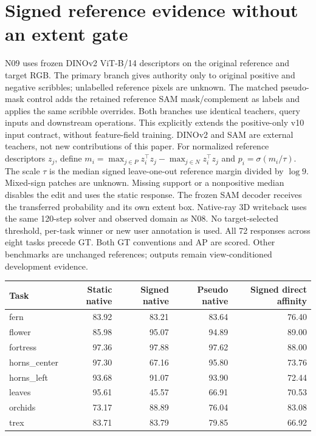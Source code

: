 \section{Signed reference evidence without an extent gate}
N09 uses frozen DINOv2 ViT-B/14 descriptors on the original reference and target RGB. The primary branch gives authority only to original positive and negative scribbles; unlabelled reference pixels are unknown. The matched pseudo-mask control adds the retained reference SAM mask/complement as labels and applies the same scribble overrides. Both branches use identical teachers, query inputs and downstream operations. This explicitly extends the positive-only v10 input contract, without feature-field training. DINOv2 and SAM are external teachers, not new contributions of this paper.
For normalized reference descriptors $z_j$, define $m_i=\max_{j\in P}z_i^\top z_j-\max_{j\in N}z_i^\top z_j$ and $p_i=\sigma(m_i/\tau)$. The scale $\tau$ is the median signed leave-one-out reference margin divided by $\log 9$. Mixed-sign patches are unknown. Missing support or a nonpositive median disables the edit and uses the static response. The frozen SAM decoder receives the transferred probability and its own extent box. Native-ray 3D writeback uses the same 120-step solver and observed domain as N08. No target-selected threshold, per-task winner or new user annotation is used.
All 72 responses across eight tasks precede GT. Both GT conventions and AP are scored. Other benchmarks are unchanged references; outputs remain view-conditioned development evidence.
\begin{center}\small\resizebox{\linewidth}{!}{}\end{center}
\begin{center}\small\begin{tabular}{lrrrr}\toprule
Task & Static native & Signed native & Pseudo native & Signed direct affinity \\\midrule
fern & 83.92 & 83.21 & 83.64 & 76.40 \\
flower & 85.98 & 95.07 & 94.89 & 89.00 \\
fortress & 97.36 & 97.88 & 97.62 & 88.00 \\
horns\_center & 97.30 & 67.16 & 95.80 & 73.76 \\
horns\_left & 93.68 & 91.07 & 93.90 & 72.44 \\
leaves & 95.61 & 45.57 & 66.91 & 70.53 \\
orchids & 73.17 & 88.89 & 76.04 & 83.08 \\
trex & 83.71 & 83.79 & 79.85 & 66.92 \\
\bottomrule\end{tabular}\end{center}
